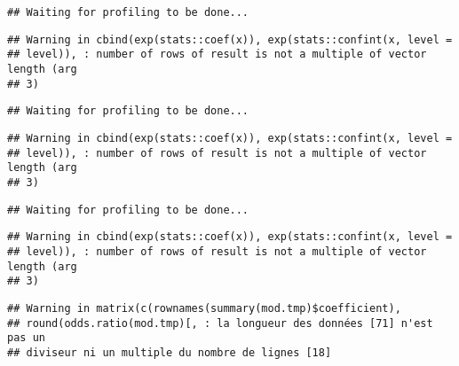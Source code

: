 \documentclass[]{article}
\newenvironment{Shaded}{\begin{snugshade}}{\end{snugshade}}
\newcommand{\KeywordTok}[1]{\textcolor[rgb]{0.13,0.29,0.53}{\textbf{#1}}}
\newcommand{\DataTypeTok}[1]{\textcolor[rgb]{0.13,0.29,0.53}{#1}}
\newcommand{\StringTok}[1]{\textcolor[rgb]{0.31,0.60,0.02}{#1}}
\newcommand{\OperatorTok}[1]{\textcolor[rgb]{0.81,0.36,0.00}{\textbf{#1}}}
\newcommand{\NormalTok}[1]{#1}
\begin{document}
\begin{verbatim}
## Waiting for profiling to be done...
\end{verbatim}

\begin{verbatim}
## Warning in cbind(exp(stats::coef(x)), exp(stats::confint(x, level =
## level)), : number of rows of result is not a multiple of vector length (arg
## 3)
\end{verbatim}

\begin{verbatim}
## Waiting for profiling to be done...
\end{verbatim}

\begin{verbatim}
## Warning in cbind(exp(stats::coef(x)), exp(stats::confint(x, level =
## level)), : number of rows of result is not a multiple of vector length (arg
## 3)
\end{verbatim}

\begin{verbatim}
## Waiting for profiling to be done...
\end{verbatim}

\begin{verbatim}
## Warning in cbind(exp(stats::coef(x)), exp(stats::confint(x, level =
## level)), : number of rows of result is not a multiple of vector length (arg
## 3)
\end{verbatim}

\begin{verbatim}
## Warning in matrix(c(rownames(summary(mod.tmp)$coefficient),
## round(odds.ratio(mod.tmp)[, : la longueur des données [71] n'est pas un
## diviseur ni un multiple du nombre de lignes [18]
\end{verbatim}

\begin{Shaded}
\end{Shaded}
\end{document}
